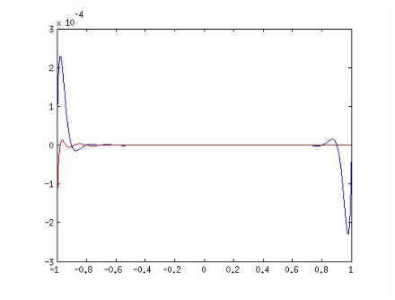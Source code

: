 \begin{enumerate}
\begin{svol}
\begin{figure}[!ht]
\begin{center}
\includegraphics[scale=.35]{fig/es6-3c.jpg}
\end{center}
\end{figure}
\end{svol}

\end{enumerate}
